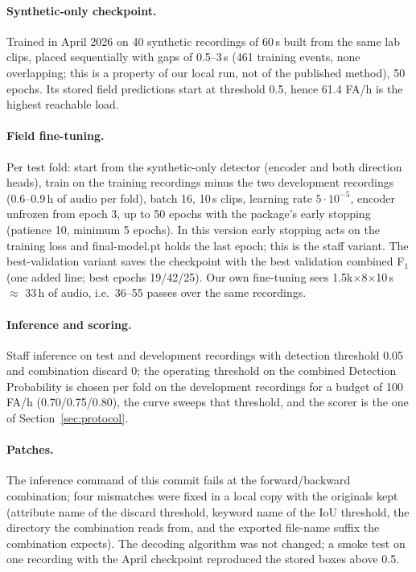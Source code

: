 \documentclass[10pt,twocolumn]{article}
\newcommand{\Fone}{F$_1$}
\begin{document}
\paragraph{Synthetic-only checkpoint.} Trained in April 2026 on 40 synthetic recordings of 60\,s built from the same lab clips, placed sequentially with gaps of 0.5--3\,s (461 training events, none overlapping; this is a property of our local run, not of the published method), 50 epochs. Its stored field predictions start at threshold 0.5, hence 61.4 FA/h is the highest reachable load.
\paragraph{Field fine-tuning.} Per test fold: start from the synthetic-only detector (encoder and both direction heads), train on the training recordings minus the two development recordings (0.6--0.9\,h of audio per fold), batch 16, 10\,s clips, learning rate $5\cdot10^{-5}$, encoder unfrozen from epoch 3, up to 50 epochs with the package's early stopping (patience 10, minimum 5 epochs). In this version early stopping acts on the training loss and final-model.pt holds the last epoch; this is the staff variant. The best-validation variant saves the checkpoint with the best validation combined \Fone{} (one added line; best epochs 19/42/25). Our own fine-tuning sees 1.5k$\times$8$\times$10\,s $\approx$ 33\,h of audio, i.e.\ 36--55 passes over the same recordings.
\paragraph{Inference and scoring.} Staff inference on test and development recordings with detection threshold 0.05 and combination discard 0; the operating threshold on the combined Detection Probability is chosen per fold on the development recordings for a budget of 100 FA/h (0.70/0.75/0.80), the curve sweeps that threshold, and the scorer is the one of Section~\ref{sec:protocol}.
\paragraph{Patches.} The inference command of this commit fails at the forward/backward combination; four mismatches were fixed in a local copy with the originals kept (attribute name of the discard threshold, keyword name of the IoU threshold, the directory the combination reads from, and the exported file-name suffix the combination expects). The decoding algorithm was not changed; a smoke test on one recording with the April checkpoint reproduced the stored boxes above 0.5.
\end{document}
